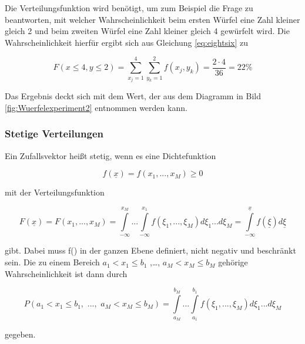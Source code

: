 \noindent Die Verteilungsfunktion wird ben\"{o}tigt, um zum Beispiel die Frage zu beantworten, mit welcher Wahrscheinlichkeit beim ersten W\"{u}rfel eine Zahl kleiner gleich 2 und beim zweiten W\"{u}rfel eine Zahl kleiner gleich 4 gew\"{u}rfelt wird. Die Wahrscheinlichkeit hierf\"{u}r ergibt sich aus Gleichung \eqref{eq:eightsix} zu

\begin{equation}\label{eq:eightseven}
F\left(x\le 4,y\le 2\right)=\sum _{x_{j} =1}^{4}\sum _{y_{k} =1}^{2}f\left(x_{j} ,y_{k} \right)  =\dfrac{2\cdot 4}{36} =22\%
\end{equation}

\noindent Das Ergebnis deckt sich mit dem Wert, der aus dem Diagramm in Bild \ref{fig:Wuerfelexperiment2} entnommen werden kann. 

\subsubsection{Stetige Verteilungen}

\noindent Ein Zufallsvektor  hei{\ss}t stetig, wenn es eine Dichtefunktion

\begin{equation}\label{eq:eighteight}
f(\underline{x})=f(x_{1} ,...,x_{M})\ge 0
\end{equation}

\noindent mit der Verteilungsfunktion

\begin{equation}\label{eq:eightnine}
F(\underline{x})=F(x_{1} ,...,x_{M})=\int\limits _{-\infty}^{x_{M}}...\int\limits _{-\infty}^{x_{1}}f(\xi _{1} ,...,\xi _{M}) d\xi _{1} ...d\xi _{M} =\int\limits_{-\infty}^{\underline{x}}f(\underline{\xi}) d\underline{\xi}
\end{equation}

\noindent gibt. Dabei muss f() in der ganzen Ebene definiert, nicht negativ und beschr\"{a}nkt sein. Die zu einem Bereich $a_{1} < x_{1} \le b_{1}$ ,{\dots}, $a_{M} < x_{M} \le b_{M}$ geh\"{o}rige Wahrscheinlichkeit ist dann durch

\begin{equation}\label{eq:eightten}
P(a_{1} <x_{1} \le  b_{ 1} ,\, \, ...,\, \,  a_{M} <x_{M} \le b_{M})=\int\limits _{a_{M}}^{b_{M}}...\int\limits _{a_{1}}^{b_{1}}f(\xi _{1} ,...,\xi _{M}) d\xi _{1} ...d\xi _{M}
\end{equation}

\noindent gegeben.\bigskip

